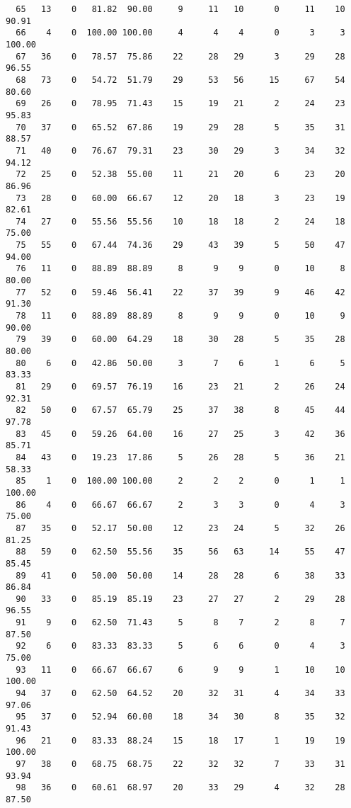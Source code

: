 \begin{verbatim}
  65   13    0   81.82  90.00     9     11   10      0     11    10    90.91
  66    4    0  100.00 100.00     4      4    4      0      3     3   100.00
  67   36    0   78.57  75.86    22     28   29      3     29    28    96.55
  68   73    0   54.72  51.79    29     53   56     15     67    54    80.60
  69   26    0   78.95  71.43    15     19   21      2     24    23    95.83
  70   37    0   65.52  67.86    19     29   28      5     35    31    88.57
  71   40    0   76.67  79.31    23     30   29      3     34    32    94.12
  72   25    0   52.38  55.00    11     21   20      6     23    20    86.96
  73   28    0   60.00  66.67    12     20   18      3     23    19    82.61
  74   27    0   55.56  55.56    10     18   18      2     24    18    75.00
  75   55    0   67.44  74.36    29     43   39      5     50    47    94.00
  76   11    0   88.89  88.89     8      9    9      0     10     8    80.00
  77   52    0   59.46  56.41    22     37   39      9     46    42    91.30
  78   11    0   88.89  88.89     8      9    9      0     10     9    90.00
  79   39    0   60.00  64.29    18     30   28      5     35    28    80.00
  80    6    0   42.86  50.00     3      7    6      1      6     5    83.33
  81   29    0   69.57  76.19    16     23   21      2     26    24    92.31
  82   50    0   67.57  65.79    25     37   38      8     45    44    97.78
  83   45    0   59.26  64.00    16     27   25      3     42    36    85.71
  84   43    0   19.23  17.86     5     26   28      5     36    21    58.33
  85    1    0  100.00 100.00     2      2    2      0      1     1   100.00
  86    4    0   66.67  66.67     2      3    3      0      4     3    75.00
  87   35    0   52.17  50.00    12     23   24      5     32    26    81.25
  88   59    0   62.50  55.56    35     56   63     14     55    47    85.45
  89   41    0   50.00  50.00    14     28   28      6     38    33    86.84
  90   33    0   85.19  85.19    23     27   27      2     29    28    96.55
  91    9    0   62.50  71.43     5      8    7      2      8     7    87.50
  92    6    0   83.33  83.33     5      6    6      0      4     3    75.00
  93   11    0   66.67  66.67     6      9    9      1     10    10   100.00
  94   37    0   62.50  64.52    20     32   31      4     34    33    97.06
  95   37    0   52.94  60.00    18     34   30      8     35    32    91.43
  96   21    0   83.33  88.24    15     18   17      1     19    19   100.00
  97   38    0   68.75  68.75    22     32   32      7     33    31    93.94
  98   36    0   60.61  68.97    20     33   29      4     32    28    87.50

\end{verbatim}
